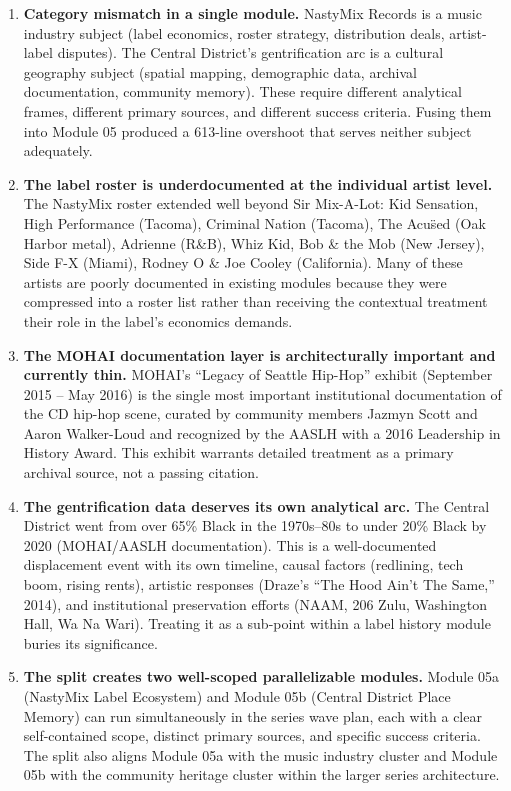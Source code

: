 \documentclass[11pt,letterpaper]{article}
\begin{document}
\begin{enumerate}
\item \textbf{Category mismatch in a single module.} NastyMix Records is a music industry subject
(label economics, roster strategy, distribution deals, artist-label disputes). The Central District's
gentrification arc is a cultural geography subject (spatial mapping, demographic data, archival
documentation, community memory). These require different analytical frames, different primary
sources, and different success criteria. Fusing them into Module 05 produced a 613-line overshoot
that serves neither subject adequately.

\item \textbf{The label roster is underdocumented at the individual artist level.} The NastyMix
roster extended well beyond Sir Mix-A-Lot: Kid Sensation, High Performance (Tacoma), Criminal
Nation (Tacoma), The Acu\"sed (Oak Harbor metal), Adrienne (R\&B), Whiz Kid, Bob \& the Mob
(New Jersey), Side F-X (Miami), Rodney O \& Joe Cooley (California). Many of these artists are
poorly documented in existing modules because they were compressed into a roster list rather than
receiving the contextual treatment their role in the label's economics demands.

\item \textbf{The MOHAI documentation layer is architecturally important and currently thin.}
MOHAI's ``Legacy of Seattle Hip-Hop'' exhibit (September 2015 -- May 2016) is the single most
important institutional documentation of the CD hip-hop scene, curated by community members
Jazmyn Scott and Aaron Walker-Loud and recognized by the AASLH with a 2016 Leadership in
History Award. This exhibit warrants detailed treatment as a primary archival source, not a
passing citation.

\item \textbf{The gentrification data deserves its own analytical arc.} The Central District went
from over 65\% Black in the 1970s--80s to under 20\% Black by 2020 (MOHAI/AASLH documentation).
This is a well-documented displacement event with its own timeline, causal factors (redlining,
tech boom, rising rents), artistic responses (Draze's ``The Hood Ain't The Same,'' 2014), and
institutional preservation efforts (NAAM, 206 Zulu, Washington Hall, Wa Na Wari). Treating it
as a sub-point within a label history module buries its significance.

\item \textbf{The split creates two well-scoped parallelizable modules.} Module 05a (NastyMix
Label Ecosystem) and Module 05b (Central District Place Memory) can run simultaneously in the
series wave plan, each with a clear self-contained scope, distinct primary sources, and specific
success criteria. The split also aligns Module 05a with the music industry cluster and Module
05b with the community heritage cluster within the larger series architecture.
\end{enumerate}
\end{document}
